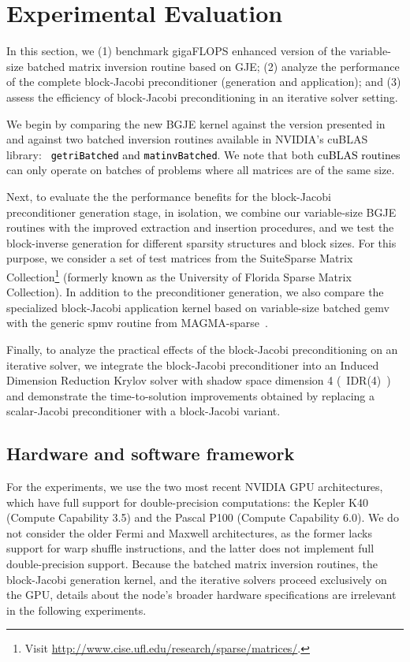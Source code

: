 \section{Experimental Evaluation}
\label{s4-experiments}

In this section, we (1) benchmark gigaFLOPS enhanced version of the variable-size
batched matrix inversion routine based on GJE; (2)
analyze the performance of the complete block-Jacobi preconditioner (generation
and application); and
(3)
assess the efficiency of block-Jacobi preconditioning in an iterative solver
setting.

We begin by comparing the new BGJE kernel against the
version presented in~\cite{Anzt:2017:BGE:3026937.3026940} and against two batched
inversion routines available in NVIDIA's cuBLAS library: \textcolor{black}{{\tt
getriBatched} and {\tt matinvBatched}}. We note that both
\textcolor{black}{cuBLAS routines} can only operate on batches of problems where
all matrices are of the same size.

Next, to evaluate the the performance benefits for the block-Jacobi
preconditioner generation stage, in isolation, we combine our variable-size BGJE
routines with the improved extraction and insertion procedures, and we test the
block-inverse generation for different sparsity structures and block sizes. For
this purpose, we consider a set of test matrices from the SuiteSparse Matrix
Collection\footnote{Visit
	\url{http://www.cise.ufl.edu/research/sparse/matrices/}.} (formerly known as the
University of Florida Sparse Matrix Collection).
In addition to the preconditioner generation, we also compare the specialized
block-Jacobi application kernel based on variable-size batched {\sc gemv} with
the generic {\sc spmv} routine from MAGMA-sparse~\cite{magma}.

Finally, to analyze the practical effects of the block-Jacobi preconditioning on
an iterative solver, we integrate the block-Jacobi preconditioner into an Induced 
Dimension Reduction Krylov solver with shadow space dimension 4 (~IDR(4)~) and demonstrate the time-to-solution 
improvements obtained by replacing a scalar-Jacobi preconditioner with a 
block-Jacobi variant.

\subsection{Hardware and software framework}

For the experiments, we use the two most recent NVIDIA GPU architectures, which have full
support for double-precision computations: the Kepler K40 (Compute Capability
3.5)
and the Pascal P100 (Compute Capability 6.0).
We do not consider the older
Fermi and Maxwell architectures, as the former lacks support for warp shuffle
instructions, and the latter does not implement full double-precision support.
Because the batched matrix inversion routines, the block-Jacobi generation kernel,
and the iterative solvers proceed exclusively on the GPU, details about the node's
broader hardware specifications are irrelevant in the following experiments.

